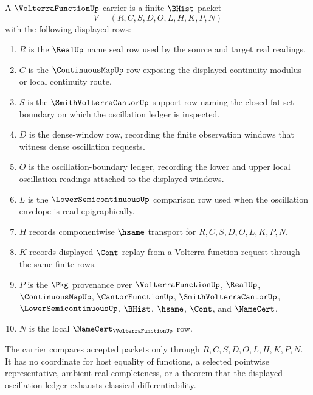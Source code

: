 \begin{definition}
\label{def:volterra-function-carrier}
A $\VolterraFunctionUp$ carrier is a finite $\BHist$ packet
$$
V=(R,C,S,D,O,L,H,K,P,N)
$$
with the following displayed rows:
\begin{enumerate}
\item $R$ is the $\RealUp$ name seal row used by the source and target real readings.
\item $C$ is the $\ContinuousMapUp$ row exposing the displayed continuity modulus or local continuity route.
\item $S$ is the $\SmithVolterraCantorUp$ support row naming the closed fat-set boundary on which the oscillation ledger is inspected.
\item $D$ is the dense-window row, recording the finite observation windows that witness dense oscillation requests.
\item $O$ is the oscillation-boundary ledger, recording the lower and upper local oscillation readings attached to the displayed windows.
\item $L$ is the $\LowerSemicontinuousUp$ comparison row used when the oscillation envelope is read epigraphically.
\item $H$ records componentwise $\hsame$ transport for $R,C,S,D,O,L,K,P,N$.
\item $K$ records displayed $\Cont$ replay from a Volterra-function request through the same finite rows.
\item $P$ is the $\Pkg$ provenance over $\VolterraFunctionUp$, $\RealUp$, $\ContinuousMapUp$, $\CantorFunctionUp$, $\SmithVolterraCantorUp$, $\LowerSemicontinuousUp$, $\BHist$, $\hsame$, $\Cont$, and $\NameCert$.
\item $N$ is the local $\NameCert_{\VolterraFunctionUp}$ row.
\end{enumerate}
The carrier compares accepted packets only through $R,C,S,D,O,L,H,K,P,N$. It has no coordinate for host equality of functions, a selected pointwise representative, ambient real completeness, or a theorem that the displayed oscillation ledger exhausts classical differentiability.
\end{definition}

